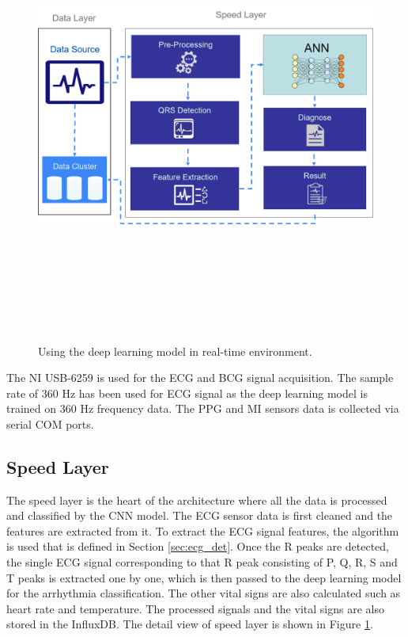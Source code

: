 \begin{figure}[htpb]
	\centering
	\includegraphics[width=16cm,height=15cm,keepaspectratio=true]{images/ann_usage_speed_layer.png}
	\caption{
		Using the deep learning model in real-time environment.
	}
	\label{fig:using_ann}
\end{figure}


The NI USB-6259 is used for the ECG and BCG signal acquisition. The sample rate of 360 Hz has been used for ECG signal as the deep learning model is trained on 360 Hz frequency data. The PPG and MI sensors data is collected via serial COM ports.

\subsection{Speed Layer}
The speed layer is the heart of the architecture where all the data is processed and classified by the CNN model. The ECG sensor data is first cleaned and the features are extracted from it.
To extract the ECG signal features, the algorithm is used that is defined in Section \ref{sec:ecg_det}. Once the R peaks are detected, the single ECG signal corresponding to that R peak consisting of P, Q, R, S and T peaks is extracted one by one, which is then passed to the deep learning model for the arrhythmia classification. The other vital signs are also calculated such as heart rate and temperature. The processed signals and the vital signs are also stored in the InfluxDB. The detail view of speed layer is shown in Figure \ref{fig:using_ann}.

